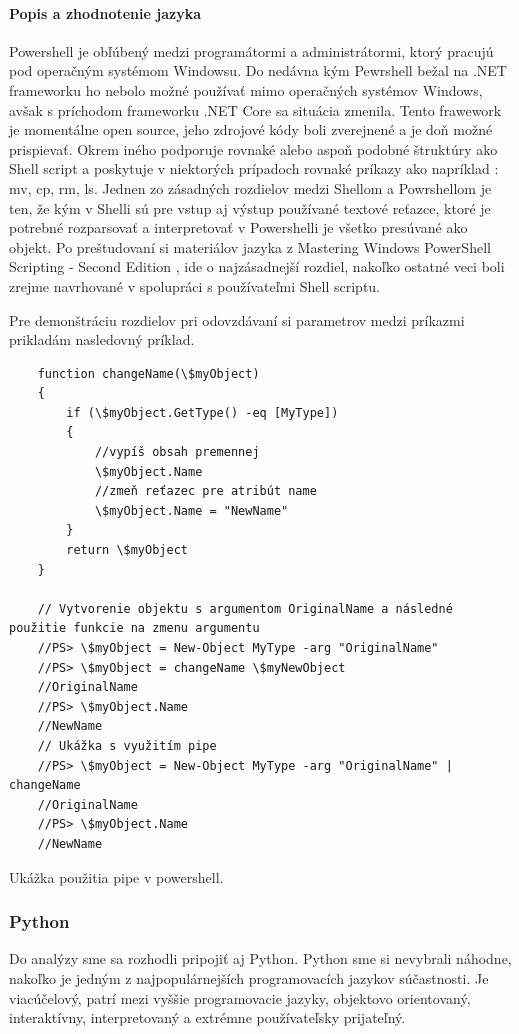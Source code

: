 \paragraph{Popis a zhodnotenie jazyka}
Powershell je obľúbený medzi programátormi a administrátormi, ktorý pracujú pod operačným systémom Windowsu. Do nedávna kým Pewrshell bežal na .NET frameworku ho nebolo možné používať mimo operačných systémov Windows, avšak s príchodom frameworku .NET Core sa situácia zmenila. Tento frawework je momentálne open source, jeho zdrojové kódy boli zverejnené a je doň možné prispievať. Okrem iného podporuje rovnaké alebo aspoň podobné štruktúry ako Shell script a poskytuje v niektorých prípadoch rovnaké príkazy ako napríklad : mv, cp, rm, ls. Jednen zo zásadných rozdielov medzi Shellom a Powrshellom je ten, že kým v Shelli sú pre vstup aj výstup používané textové reťazce, ktoré je potrebné rozparsovať a interpretovať v Powershelli je všetko presúvané ako objekt. Po preštudovaní si materiálov jazyka z Mastering Windows PowerShell Scripting - Second Edition \cite{psbook}, ide o najzásadnejší rozdiel, nakoľko ostatné veci boli zrejme navrhované v spolupráci s používateľmi Shell scriptu.

Pre demonštráciu rozdielov pri odovzdávaní si parametrov medzi príkazmi prikladám nasledovný príklad.
\newpage
\begin{algorithm}
	\begin{verbatim}
	function changeName(\$myObject)
	{
		if (\$myObject.GetType() -eq [MyType])
		{
			//vypíš obsah premennej
			\$myObject.Name
			//zmeň reťazec pre atribút name
			\$myObject.Name = "NewName"
		}
		return \$myObject
	}
	
	// Vytvorenie objektu s argumentom OriginalName a následné použitie funkcie na zmenu argumentu
	//PS> \$myObject = New-Object MyType -arg "OriginalName"
	//PS> \$myObject = changeName \$myNewObject
	//OriginalName
	//PS> \$myObject.Name
	//NewName
	// Ukážka s využitím pipe
	//PS> \$myObject = New-Object MyType -arg "OriginalName" | changeName
	//OriginalName
	//PS> \$myObject.Name
	//NewName
	\end{verbatim}
	\caption{Ukážka použitia pipe v powershell. \cite{netalg}}
	\label{alg:gen}
\end{algorithm}

\subsubsection{Python}
\indent Do analýzy sme sa rozhodli pripojiť aj Python. Python sme si nevybrali náhodne, nakoľko je jedným z najpopulárnejších programovacích jazykov súčastnosti. Je viacúčelový, patrí mezi vyššie programovacie jazyky, objektovo orientovaný, interaktívny, interpretovaný a extrémne používateľsky prijateľný.
